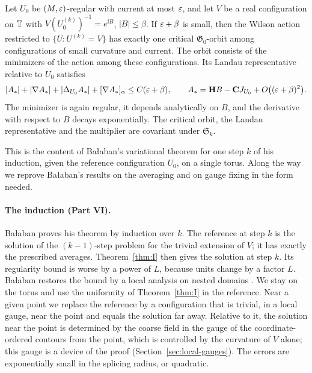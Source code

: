 \begin{maintheorem}\label{thm:I}
Let $U_0$ be $(M,\varepsilon)$-regular with current at most $\varepsilon$, and let $V$ be a real configuration on $\mathbb T$ with $V(U_0^{(k)})^{-1}=e^{\ii B}$, $|B|\le\beta$. If $\varepsilon+\beta$ is small, then the Wilson action restricted to $\{U:U^{(k)}=V\}$ has exactly one critical $\mathfrak G_0$-orbit among configurations of small curvature and current. The orbit consists of the minimizers of the action among these configurations. Its Landau representative relative to $U_0$ satisfies
\[
|A_*|+|\nabla A_*|+|\Delta_{U_0}A_*|+[\nabla A_*]_\alpha\le C(\varepsilon+\beta),\qquad A_*=\mathbf H B-\mathbf C J_{U_0}+O\big((\varepsilon+\beta)^2\big).
\]
The minimizer is again regular, it depends analytically on $B$, and the derivative with respect to $B$ decays exponentially. The critical orbit, the Landau representative and the multiplier are covariant under $\mathfrak S_k$.
\end{maintheorem}

This is the content of Ba\l aban's variational theorem \cite[Theorem~1]{BalVar} for one step $k$ of his induction, given the reference configuration $U_0$, on a single torus. Along the way we reprove Ba\l aban's results on the averaging \cite{BalAvg} and on gauge fixing \cite{BalReg} in the form needed.

\paragraph{The induction (Part VI).} Ba\l aban proves his theorem by induction over $k$. The reference at step $k$ is the solution of the $(k-1)$-step problem for the trivial extension of $V$; it has exactly the prescribed averages. Theorem~\ref{thm:I} then gives the solution at step $k$. Its regularity bound is worse by a power of $L$, because units change by a factor $L$. Ba\l aban restores the bound by a local analysis on nested domains \cite[Sect.~F]{BalVar}. We stay on the torus and use the uniformity of Theorem~\ref{thm:I} in the reference. Near a given point we replace the reference by a configuration that is trivial, in a local gauge, near the point and equals the solution far away. Relative to it, the solution near the point is determined by the coarse field in the gauge of the coordinate-ordered contours from the point, which is controlled by the curvature of $V$ alone; this gauge is a device of the proof (Section~\ref{sec:local-gauges}). The errors are exponentially small in the splicing radius, or quadratic.

